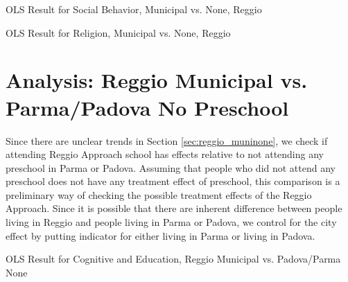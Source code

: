 
\begin{table}[H]
\begin{center}
	\caption{OLS Result for Social Behavior, Municipal vs. None, Reggio} \label{tab:rvsother_S}
		
\end{center}
\end{table}



\begin{table}[H]
\begin{center}
	\caption{OLS Result for Religion, Municipal vs. None, Reggio} \label{tab:rvsother_R}
		
\end{center}
\end{table}




\section{Analysis: Reggio Municipal vs. Parma/Padova No Preschool}

Since there are unclear trends in Section \ref{sec:reggio_muninone}, we check if attending Reggio Approach school has effects relative to not attending any preschool in Parma or Padova. Assuming that people who did not attend any preschool does not have any treatment effect of preschool, this comparison is a preliminary way of checking the possible treatment effects of the Reggio Approach. Since it is possible that there are inherent difference between people living in Reggio and people living in Parma or Padova, we control for the city effect by putting indicator for either living in Parma or living in Padova. 

 
\begin{table}[H]
\begin{center}
	\caption{OLS Result for Cognitive and Education, Reggio Municipal vs. Padova/Parma None} \label{tab:rvsother_E}
		
\end{center}
\end{table}




